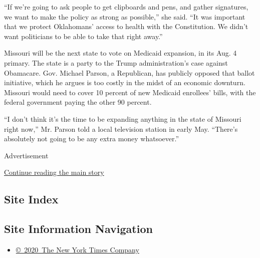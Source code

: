 ``If we're going to ask people to get clipboards and pens, and gather
signatures, we want to make the policy as strong as possible,'' she
said. ``It was important that we protect Oklahomans' access to health
with the Constitution. We didn't want politicians to be able to take
that right away.''

Missouri will be the next state to vote on Medicaid expansion, in its
Aug. 4 primary. The state is a party to the Trump administration's case
against Obamacare. Gov. Michael Parson, a Republican, has publicly
opposed that ballot initiative, which he argues is too costly in the
midst of an economic downturn. Missouri would need to cover 10 percent
of new Medicaid enrollees' bills, with the federal government paying the
other 90 percent.

``I don't think it's the time to be expanding anything in the state of
Missouri right now,'' Mr. Parson told a local television station in
early May. ``There's absolutely not going to be any extra money
whatsoever.''

Advertisement

\protect\hyperlink{after-bottom}{Continue reading the main story}

\hypertarget{site-index}{%
\subsection{Site Index}\label{site-index}}

\hypertarget{site-information-navigation}{%
\subsection{Site Information
Navigation}\label{site-information-navigation}}

\begin{itemize}
\tightlist
\item
  \href{https://help.nytimes3xbfgragh.onion/hc/en-us/articles/115014792127-Copyright-notice}{©~2020~The
  New York Times Company}
\end{itemize}


